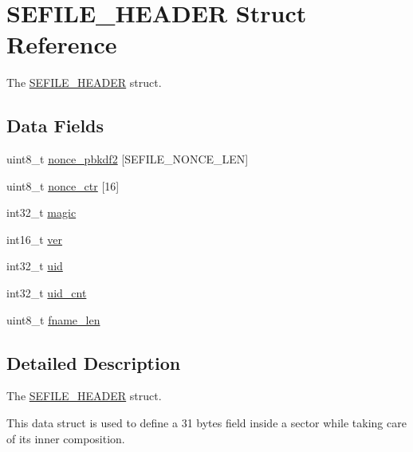 \hypertarget{struct_s_e_f_i_l_e___h_e_a_d_e_r}{\section{S\-E\-F\-I\-L\-E\-\_\-\-H\-E\-A\-D\-E\-R Struct Reference}
\label{struct_s_e_f_i_l_e___h_e_a_d_e_r}
}


The \hyperlink{struct_s_e_f_i_l_e___h_e_a_d_e_r}{S\-E\-F\-I\-L\-E\-\_\-\-H\-E\-A\-D\-E\-R} struct.  


\subsection*{Data Fields}
\begin{DoxyCompactItemize}
\item 
uint8\-\_\-t \hyperlink{struct_s_e_f_i_l_e___h_e_a_d_e_r_a7ebb6ac2da3fc9384e1ed12cdbbeb03c}{nonce\-\_\-pbkdf2} \mbox{[}S\-E\-F\-I\-L\-E\-\_\-\-N\-O\-N\-C\-E\-\_\-\-L\-E\-N\mbox{]}
\item 
uint8\-\_\-t \hyperlink{struct_s_e_f_i_l_e___h_e_a_d_e_r_adcb7b8a5fc9e93d1fbf348b144883bf9}{nonce\-\_\-ctr} \mbox{[}16\mbox{]}
\item 
int32\-\_\-t \hyperlink{struct_s_e_f_i_l_e___h_e_a_d_e_r_a552830c2eab29ca1ce93f18cf8aff306}{magic}
\item 
int16\-\_\-t \hyperlink{struct_s_e_f_i_l_e___h_e_a_d_e_r_a243bb9ed827d6f802720231425ee240c}{ver}
\item 
int32\-\_\-t \hyperlink{struct_s_e_f_i_l_e___h_e_a_d_e_r_a3c573cee7709f63a385460ad21637ec1}{uid}
\item 
int32\-\_\-t \hyperlink{struct_s_e_f_i_l_e___h_e_a_d_e_r_ae10c6516ac00e694db72a45ef16a214c}{uid\-\_\-cnt}
\item 
uint8\-\_\-t \hyperlink{struct_s_e_f_i_l_e___h_e_a_d_e_r_a6ef79b4f4b76a57b2610bda99f34afdc}{fname\-\_\-len}
\end{DoxyCompactItemize}


\subsection{Detailed Description}
The \hyperlink{struct_s_e_f_i_l_e___h_e_a_d_e_r}{S\-E\-F\-I\-L\-E\-\_\-\-H\-E\-A\-D\-E\-R} struct. 

This data struct is used to define a 31 bytes field inside a sector while taking care of its inner composition. 

